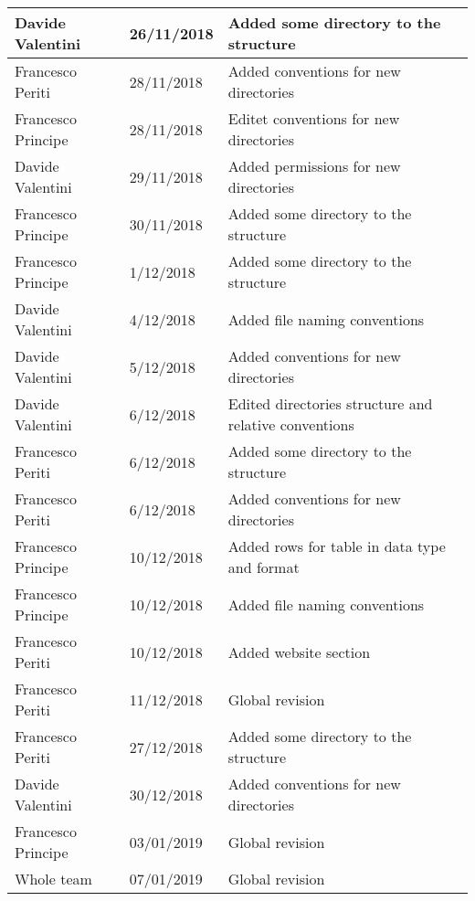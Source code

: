\begin{table}[H]
\begin{tabularx}{\textwidth}{|l|l|X|}
Davide Valentini & 26/11/2018 & Added some directory to the structure\\ \hline
Francesco Periti & 28/11/2018 & Added conventions for new directories\\ \hline
Francesco Principe & 28/11/2018 & Editet conventions for new directories\\ \hline
Davide Valentini & 29/11/2018 & Added permissions for new directories\\ \hline
Francesco Principe & 30/11/2018 & Added some directory to the structure\\ \hline
Francesco Principe & 1/12/2018 & Added some directory to the structure\\ \hline
Davide Valentini & 4/12/2018 & Added file naming conventions\\ \hline
Davide Valentini & 5/12/2018 & Added conventions for new directories\\ \hline
Davide Valentini & 6/12/2018 & Edited directories structure and relative conventions\\ \hline
Francesco Periti & 6/12/2018 & Added some directory to the structure\\ \hline
Francesco Periti & 6/12/2018 & Added conventions for new directories\\ \hline
Francesco Principe & 10/12/2018 &  Added rows for table in data type and format\\ \hline
Francesco Principe & 10/12/2018 & Added file naming conventions\\ \hline
Francesco Periti & 10/12/2018 & Added website section\\ \hline
Francesco Periti & 11/12/2018 & Global revision\\ \hline
Francesco Periti & 27/12/2018 & Added some directory to the structure\\ \hline
Davide Valentini & 30/12/2018 & Added conventions for new directories\\ \hline
Francesco Principe & 03/01/2019 & Global revision\\ \hline
Whole team & 07/01/2019 & Global revision \\ \hline
\end{tabularx}
\end{table}
